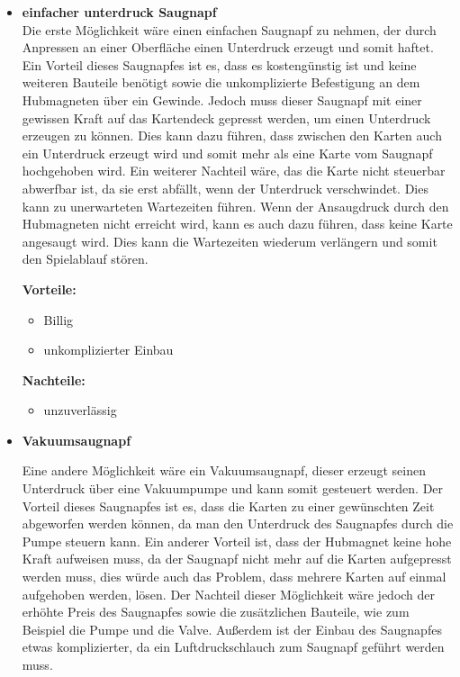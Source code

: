 \begin{itemize}
    \item \textbf{einfacher unterdruck Saugnapf} \\
    Die erste Möglichkeit wäre einen einfachen Saugnapf zu nehmen, der durch Anpressen an einer Oberfläche einen Unterdruck erzeugt und somit haftet. Ein Vorteil dieses Saugnapfes ist es, dass es kostengünstig ist und keine weiteren Bauteile benötigt sowie die
    unkomplizierte Befestigung an dem Hubmagneten über ein Gewinde.
    Jedoch muss dieser Saugnapf mit einer gewissen Kraft auf das Kartendeck gepresst werden, um einen Unterdruck erzeugen zu können. Dies kann dazu führen, dass zwischen den Karten auch ein Unterdruck erzeugt wird und somit mehr als eine Karte vom Saugnapf
    hochgehoben wird. Ein weiterer Nachteil wäre, das die Karte nicht steuerbar abwerfbar ist, da sie erst abfällt, wenn der Unterdruck verschwindet. Dies kann zu unerwarteten Wartezeiten führen. Wenn der Ansaugdruck durch den Hubmagneten nicht erreicht wird, kann
    es auch dazu führen, dass keine Karte angesaugt wird. Dies kann die Wartezeiten wiederum verlängern und somit den Spielablauf stören.

    \textbf{Vorteile:}
    \begin{itemize}
        \item Billig
        \item unkomplizierter Einbau
    \end{itemize}
    \textbf{Nachteile:}
    \begin{itemize}
        \item unzuverlässig
    \end{itemize}

    \item \textbf{Vakuumsaugnapf}

    Eine andere Möglichkeit wäre ein Vakuumsaugnapf, dieser erzeugt seinen Unterdruck über eine Vakuumpumpe und kann somit gesteuert werden. Der Vorteil dieses Saugnapfes ist es, dass die Karten zu einer gewünschten Zeit abgeworfen werden können, da man den
    Unterdruck des Saugnapfes durch die Pumpe steuern kann. Ein anderer Vorteil ist, dass der Hubmagnet keine hohe Kraft aufweisen muss, da der Saugnapf nicht mehr auf die Karten aufgepresst werden muss, dies würde auch das Problem, dass mehrere Karten auf einmal
    aufgehoben werden, lösen. Der Nachteil dieser Möglichkeit wäre jedoch der erhöhte Preis des Saugnapfes sowie die zusätzlichen Bauteile, wie zum Beispiel die Pumpe und die Valve. Außerdem ist der Einbau des Saugnapfes etwas komplizierter, da ein Luftdruckschlauch
    zum Saugnapf geführt werden muss.


\end{itemize}
